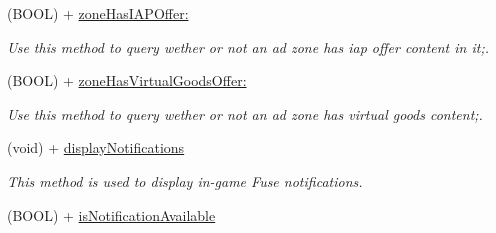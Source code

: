 \begin{DoxyCompactItemize}
(B\+O\+O\+L) + \hyperlink{interface_fuse_s_d_k_adb67f99bc2972de6774949fc2849f548}{zone\+Has\+I\+A\+P\+Offer\+:}
\begin{DoxyCompactList}\small\item\em Use this method to query wether or not an ad zone has iap offer content in it;. \end{DoxyCompactList}\item 
(B\+O\+O\+L) + \hyperlink{interface_fuse_s_d_k_a898ce4e1d5235fd40627429d1f7bf138}{zone\+Has\+Virtual\+Goods\+Offer\+:}
\begin{DoxyCompactList}\small\item\em Use this method to query wether or not an ad zone has virtual goods content;. \end{DoxyCompactList}\item 
(void) + \hyperlink{interface_fuse_s_d_k_a279e4cb8e95a3e78197761156a7de50d}{display\+Notifications}
\begin{DoxyCompactList}\small\item\em This method is used to display in-\/game Fuse notifications. \end{DoxyCompactList}\item 
\hypertarget{interface_fuse_s_d_k_a23c30bc15f208daf639ece250b8a5935}{}(B\+O\+O\+L) + \hyperlink{interface_fuse_s_d_k_a23c30bc15f208daf639ece250b8a5935}{is\+Notification\+Available}\label{interface_fuse_s_d_k_a23c30bc15f208daf639ece250b8a5935}


\end{DoxyCompactItemize}
